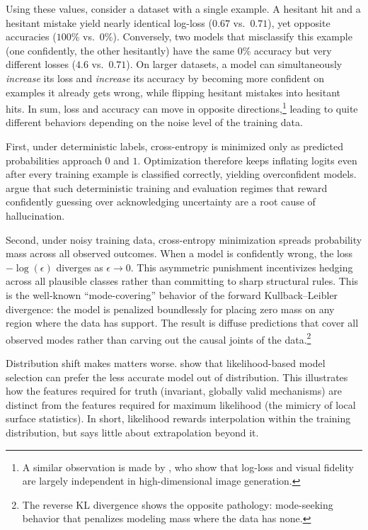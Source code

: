 Using these values, consider a dataset with a single example. A hesitant hit and a hesitant mistake yield nearly identical log-loss ($0.67$ vs.\ $0.71$), yet opposite accuracies ($100\%$ vs.\ $0\%$). Conversely, two models that misclassify this example (one confidently, the other hesitantly) have the same $0\%$ accuracy but very different losses ($4.6$ vs.\ $0.71$). On larger datasets, a model can simultaneously \emph{increase} its loss and \emph{increase} its accuracy by becoming more confident on examples it already gets wrong, while flipping hesitant mistakes into hesitant hits. In sum, loss and accuracy can move in opposite directions,\footnote{A similar observation is made by \citet{theis2016}, who show that log-loss and visual fidelity are largely independent in high-dimensional image generation.} leading to quite different behaviors depending on the noise level of the training data.

First, under deterministic labels, cross-entropy is minimized only as predicted probabilities approach $0$ and $1$. Optimization therefore keeps inflating logits even after every training example is classified correctly, yielding overconfident models. \citet{kalai2025} argue that such deterministic training and evaluation regimes that reward confidently guessing over acknowledging uncertainty are a root cause of hallucination.

Second, under noisy training data, cross-entropy minimization spreads probability mass across all observed outcomes. When a model is confidently wrong, the loss $-\log(\epsilon)$ diverges as $\epsilon \to 0$. This asymmetric punishment incentivizes hedging across all plausible classes rather than committing to sharp structural rules. This is the well-known ``mode-covering'' behavior of the forward Kullback--Leibler divergence: the model is penalized boundlessly for placing zero mass on any region where the data has support. The result is diffuse predictions that cover all observed modes rather than carving out the causal joints of the data.\footnote{The reverse KL divergence shows the opposite pathology: mode-seeking behavior that penalizes modeling mass where the data has none.} 

Distribution shift makes matters worse. \citet{velickovic2026} show that likelihood-based model selection can prefer the less accurate model out of distribution. This illustrates how the features required for truth (invariant, globally valid mechanisms) are distinct from the features required for maximum likelihood (the mimicry of local surface statistics). In short, likelihood rewards interpolation within the training distribution, but says little about extrapolation beyond it.


